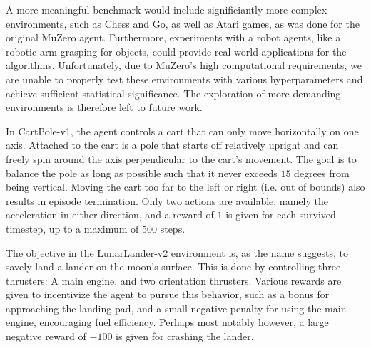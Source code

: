 A more meaningful benchmark would include significiantly more complex environments, such as Chess and Go, as well as Atari games, as was done for the original MuZero agent. Furthermore, experiments with a robot agents, like a robotic arm grasping for objects, could provide real world applications for the algorithms. Unfortunately, due to MuZero's high computational requirements, we are unable to properly test these environments with various hyperparameters and achieve sufficient statistical significance. The exploration of more demanding environments is therefore left to future work.

In CartPole-v1, the agent controls a cart that can only move horizontally on one axis. Attached to the cart is a pole that starts off relatively upright and can freely spin around the axis perpendicular to the cart's movement. The goal is to balance the pole as long as possible such that it never exceeds $15$ degrees from being vertical. Moving the cart too far to the left or right (i.e. out of bounds) also results in episode termination. Only two actions are available, namely the acceleration in either direction, and a reward of $1$ is given for each survived timestep, up to a maximum of $500$ steps.

The objective in the LunarLander-v2 environment is, as the name suggests, to savely land a lander on the moon's surface. This is done by controlling three thrusters: A main engine, and two orientation thrusters. Various rewards are given to incentivize the agent to pursue this behavior, such as a bonus for approaching the landing pad, and a small negative penalty for using the main engine, encouraging fuel efficiency. Perhaps most notably however, a large negative reward of $-100$ is given for crashing the lander.